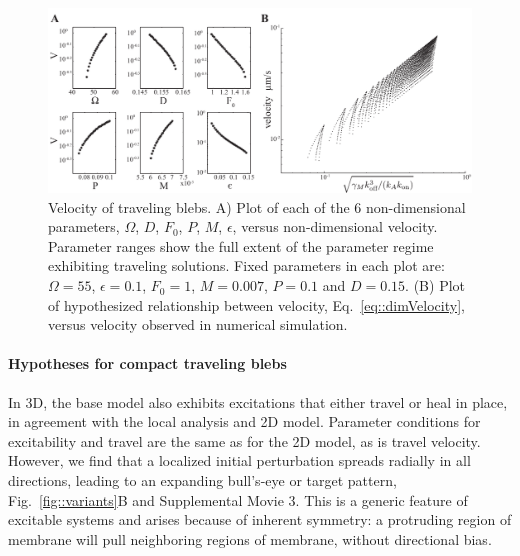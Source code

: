 \begin{figure}
   \begin{center}
   \captionsetup{width=17cm}
     \includegraphics*[width=17cm,center]{Project1/figs/figure5}
      \caption{Velocity of traveling blebs. A) Plot of each of the 6 non-dimensional parameters, $\Omega$, $D$, $F_0$, $P$, $M$, $\epsilon$, versus non-dimensional velocity. Parameter ranges show the full extent of the parameter regime exhibiting traveling solutions. Fixed parameters in each plot are: $\Omega = 55$, $\epsilon = 0.1$, $F_0 = 1$, $M = 0.007$, $P = 0.1$ and $D = 0.15$. (B) Plot of hypothesized relationship between velocity, Eq.~\ref{eq::dimVelocity}, versus velocity observed in numerical simulation.}
      \label{fig::velocity}
   \end{center}
\end{figure}

\paragraph{Hypotheses for compact traveling blebs}

In 3D, the base model also exhibits excitations that either travel or heal in place, in agreement with the local analysis and 2D model. Parameter conditions for excitability and travel are the same as for the 2D model, as is travel velocity. However, we find that a localized initial perturbation spreads radially in all directions, leading to an expanding bull's-eye or target pattern, Fig.~\ref{fig::variants}B and {Supplemental Movie 3}. This is a generic feature of excitable systems and arises because of  inherent symmetry: a protruding region of membrane will pull neighboring regions of membrane, without directional bias. 

